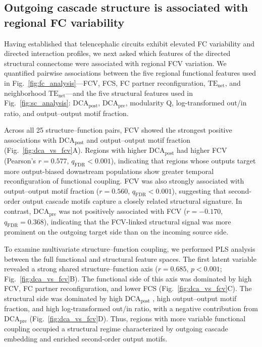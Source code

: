 \documentclass[9pt,twocolumn,twoside]{pnas-new}
\begin{document}
\subsection*{Outgoing cascade structure is associated with regional FC variability}

Having established that telencephalic circuits exhibit elevated FC variability and directed interaction profiles, we next asked which features of the directed structural connectome were associated with regional FCV variation. We quantified pairwise associations between the five regional functional features used in Fig.~\ref{fig:fc_analysis}---FCV, FCS, FC partner reconfiguration, $\mathrm{TE}_{\mathrm{net}}$, and neighborhood $\mathrm{TE}_{\mathrm{net}}$---and the five structural features used in Fig.~\ref{fig:sc_analysis}: $\mathrm{DCA}_{\mathrm{post}}$, $\mathrm{DCA}_{\mathrm{pre}}$, modularity Q, log-transformed out/in ratio, and output--output motif fraction.

Across all 25 structure--function pairs, FCV showed the strongest positive associations with $\mathrm{DCA}_{\mathrm{post}}$ and output--output motif fraction (Fig.~\ref{fig:dca_vs_fcv}A). Regions with higher $\mathrm{DCA}_{\mathrm{post}}$ had higher FCV (Pearson's $r = 0.577$, $q_{\mathrm{FDR}} < 0.001$), indicating that regions whose outputs target more output-biased downstream populations show greater temporal reconfiguration of functional coupling. FCV was also strongly associated with output--output motif fraction ($r = 0.560$, $q_{\mathrm{FDR}} < 0.001$), suggesting that second-order output cascade motifs capture a closely related structural signature. In contrast, $\mathrm{DCA}_{\mathrm{pre}}$ was not positively associated with FCV ($r = -0.170$, $q_{\mathrm{FDR}} = 0.368$), indicating that the FCV-linked structural signal was more prominent on the outgoing target side than on the incoming source side.


To examine multivariate structure--function coupling, we performed PLS analysis between the full functional and structural feature spaces. The first latent variable revealed a strong shared structure--function axis ($r = 0.685$, $p < 0.001$; Fig.~\ref{fig:dca_vs_fcv}B). The functional side of this axis was dominated by high FCV, FC partner reconfiguration, and lower FCS (Fig.~\ref{fig:dca_vs_fcv}C). The structural side was dominated by high $\mathrm{DCA}_{\mathrm{post}}$ , high output--output motif fraction, and high log-transformed out/in ratio, with a negative contribution from $\mathrm{DCA}_{\mathrm{pre}}$ (Fig.~\ref{fig:dca_vs_fcv}D). Thus, regions with more variable functional coupling occupied a structural regime characterized by outgoing cascade embedding and enriched second-order output motifs.
\end{document}
